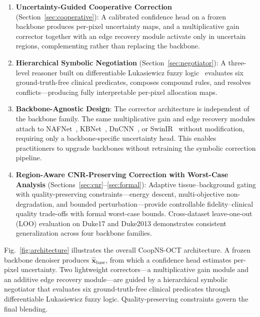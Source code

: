 \documentclass[journal,twoside,web]{ieeecolor}
\begin{document}
\begin{enumerate}
\item \textbf{Uncertainty-Guided Cooperative Correction} (Section~\ref{sec:cooperative}): A calibrated confidence head on a frozen backbone produces per-pixel uncertainty maps, and a multiplicative gain corrector together with an edge recovery module activate only in uncertain regions, complementing rather than replacing the backbone.

\item \textbf{Hierarchical Symbolic Negotiation} (Section~\ref{sec:negotiator}): A three-level reasoner built on differentiable Lukasiewicz fuzzy logic~\cite{vankrieken2022analyzing} evaluates six ground-truth-free clinical predicates, composes compound rules, and resolves conflicts---producing fully interpretable per-pixel allocation maps.

\item \textbf{Backbone-Agnostic Design}: The corrector architecture is independent of the backbone family. The same multiplicative gain and edge recovery modules attach to NAFNet~\cite{chen2022simple}, KBNet~\cite{zhang2023kbnet}, DnCNN~\cite{zhang2017beyond}, or SwinIR~\cite{liang2021swinir} without modification, requiring only a backbone-specific uncertainty head. This enables practitioners to upgrade backbones without retraining the symbolic correction pipeline.

\item \textbf{Region-Aware CNR-Preserving Correction with Worst-Case Analysis} (Sections~\ref{sec:cnr}--\ref{sec:formal}): Adaptive tissue--background gating with quality-preserving constraints---energy descent, multi-objective non-degradation, and bounded perturbation---provide controllable fidelity--clinical quality trade-offs with formal worst-case bounds. Cross-dataset leave-one-out (LOO) evaluation on Duke17 and Duke2013 demonstrates consistent generalization across four backbone families.
\end{enumerate}

Fig.~\ref{fig:architecture} illustrates the overall CoopNS-OCT architecture. A frozen backbone denoiser produces $\hat{\mathbf{x}}_\text{base}$, from which a confidence head estimates per-pixel uncertainty. Two lightweight correctors---a multiplicative gain module and an additive edge recovery module---are guided by a hierarchical symbolic negotiator that evaluates six ground-truth-free clinical predicates through differentiable Lukasiewicz fuzzy logic. Quality-preserving constraints govern the final blending.
\end{document}
